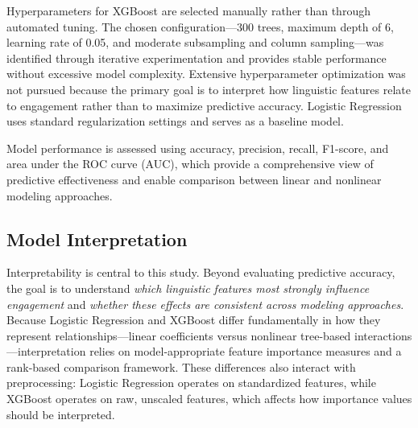 \documentclass[12pt]{article}
\begin{document}
Hyperparameters for XGBoost are selected manually rather than through automated tuning. The chosen configuration—300 trees, maximum depth of 6, learning rate of 0.05, and moderate subsampling and column sampling—was identified through iterative experimentation and provides stable performance without excessive model complexity. Extensive hyperparameter optimization was not pursued because the primary goal is to interpret how linguistic features relate to engagement rather than to maximize predictive accuracy. Logistic Regression uses standard regularization settings and serves as a baseline model.

Model performance is assessed using accuracy, precision, recall, F1-score, and area under the ROC curve (AUC), which provide a comprehensive view of predictive effectiveness and enable comparison between linear and nonlinear modeling approaches.

\subsection{Model Interpretation}

Interpretability is central to this study. Beyond evaluating predictive accuracy, the goal is to understand \emph{which linguistic features most strongly influence engagement} and \emph{whether these effects are consistent across modeling approaches}. Because Logistic Regression and XGBoost differ fundamentally in how they represent relationships—linear coefficients versus nonlinear tree-based interactions—interpretation relies on model-appropriate feature importance measures and a rank-based comparison framework. These differences also interact with preprocessing: Logistic Regression operates on standardized features, while XGBoost operates on raw, unscaled features, which affects how importance values should be interpreted.
\end{document}
